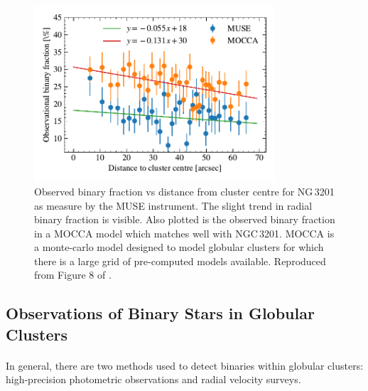\begin{figure}
	\centering
	\includegraphics[width=0.8\textwidth]{figures/radial_binarity.pdf}
	\caption{Observed binary fraction vs distance from cluster centre for NG\,3201 as measure by
		the MUSE instrument. The slight trend in radial binary fraction is visible. Also plotted is
		the observed binary fraction in a MOCCA model which matches well with NGC\,3201. MOCCA is a
		monte-carlo model designed to model globular clusters for which there is a large grid of
		pre-computed models available. Reproduced from Figure 8 of \citet{Giesers2019}.}
	\label{fig:1/radial_binary_fraction}
\end{figure}

\subsection{Observations of Binary Stars in Globular Clusters}

\paragraph{}
In general, there are two methods used to detect binaries within globular clusters: high-precision
photometric observations and radial velocity surveys.

